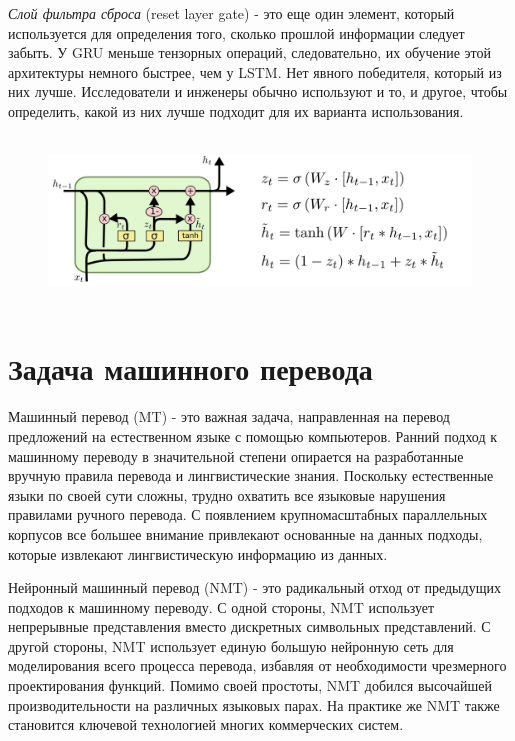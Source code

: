     \textit{Слой фильтра сброса} (reset layer gate) - это еще один элемент, который используется для определения того, сколько прошлой информации следует забыть.
    У GRU меньше тензорных операций, следовательно, их обучение этой архитектуры немного быстрее, чем у LSTM. Нет явного победителя, который из них лучше. Исследователи и инженеры обычно используют и то, и другое, чтобы определить, какой из них лучше подходит для их варианта использования.
    
    \begin{figure}[ht!]
		\centering
		\captionsetup{justification=centering}
		\includegraphics[height=45mm]{img/GRU.png}
	\end{figure}
	
	\clearpage
 	
	\section{Задача машинного перевода}
	
	Машинный перевод (MT) - это важная задача, направленная на перевод предложений на естественном языке с помощью компьютеров. Ранний подход к машинному переводу в значительной степени опирается на разработанные вручную правила перевода и лингвистические знания. Поскольку естественные языки по своей сути сложны, трудно охватить все языковые нарушения правилами ручного перевода. С появлением крупномасштабных параллельных корпусов все большее внимание привлекают основанные на данных подходы, которые извлекают лингвистическую информацию из данных.
	
	Нейронный машинный перевод (NMT) - это радикальный отход от предыдущих подходов к машинному переводу. С одной стороны, NMT использует непрерывные представления вместо дискретных символьных представлений. С другой стороны, NMT использует единую большую нейронную сеть для моделирования всего процесса перевода, избавляя от необходимости чрезмерного проектирования функций. Помимо своей простоты, NMT добился высочайшей производительности на различных языковых парах. На практике же NMT также становится ключевой технологией многих коммерческих систем.
	
